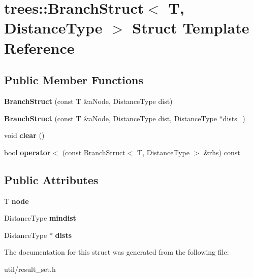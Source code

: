 \hypertarget{structtrees_1_1_branch_struct}{}\section{trees\+:\+:Branch\+Struct$<$ T, Distance\+Type $>$ Struct Template Reference}
\label{structtrees_1_1_branch_struct}
\subsection*{Public Member Functions}
\begin{DoxyCompactItemize}
\item 
\mbox{\label{structtrees_1_1_branch_struct_a7f2c8a75382a0b48aa8342ed65fb0b19}} 
{\bfseries Branch\+Struct} (const T \&a\+Node, Distance\+Type dist)
\item 
\mbox{\label{structtrees_1_1_branch_struct_aaf0c81accb385dee2560d1157eac9a5e}} 
{\bfseries Branch\+Struct} (const T \&a\+Node, Distance\+Type dist, Distance\+Type $\ast$dists\+\_\+)
\item 
\mbox{\label{structtrees_1_1_branch_struct_a09ce496507ee30a910bcda1d4c65ab89}} 
void {\bfseries clear} ()
\item 
\mbox{\label{structtrees_1_1_branch_struct_a760336c1aab5e59227bfdbe0e6a56462}} 
bool {\bfseries operator$<$} (const \hyperlink{structtrees_1_1_branch_struct}{Branch\+Struct}$<$ T, Distance\+Type $>$ \&rhs) const
\end{DoxyCompactItemize}
\subsection*{Public Attributes}
\begin{DoxyCompactItemize}
\item 
\mbox{\label{structtrees_1_1_branch_struct_a1bd0cc2136455fb1da2c7cb00bb575ed}} 
T {\bfseries node}
\item 
\mbox{\label{structtrees_1_1_branch_struct_a94935ab23accd67809ddf383357731dc}} 
Distance\+Type {\bfseries mindist}
\item 
\mbox{\label{structtrees_1_1_branch_struct_a07d1fdf824f99318047b219118ebb250}} 
Distance\+Type $\ast$ {\bfseries dists}
\end{DoxyCompactItemize}


The documentation for this struct was generated from the following file\+:\begin{DoxyCompactItemize}
\item 
util/result\+\_\+set.\+h\end{DoxyCompactItemize}
